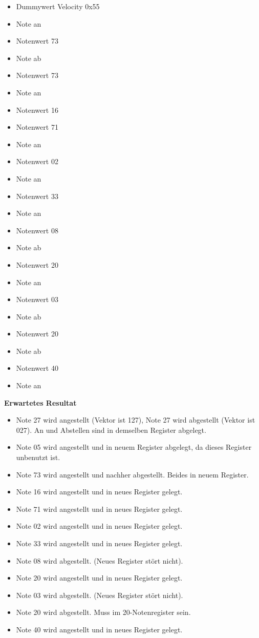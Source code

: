 \begin{itemize}
\item Dummywert Velocity 0x55
\item Note an
\item Notenwert 73
\item Note ab
\item Notenwert 73
\item Note an
\item Notenwert 16
\end{itemize}

\begin{itemize}
\item Notenwert 71
\item Note an
\item Notenwert 02
\item Note an
\item Notenwert 33
\item Note an
\item Notenwert 08
\item Note ab
\end{itemize}

\begin{itemize}
\item Notenwert 20
\item Note an
\item Notenwert 03
\item Note ab
\item Notenwert 20
\item Note ab
\item Notenwert 40
\item Note an
\end{itemize}

\textbf{Erwartetes Resultat}

\begin{itemize}
\item Note 27 wird angestellt (Vektor ist 127), Note 27 wird abgestellt (Vektor ist 027). An und Abstellen sind in demselben Register abgelegt.
\item Note 05 wird angestellt und in neuem Register abgelegt, da dieses Register unbenutzt ist.
\item Note 73 wird angestellt und nachher abgestellt. Beides in neuem Register.
\item Note 16 wird angestellt und in neues Register gelegt.
\item Note 71 wird angestellt und in neues Register gelegt.
\item Note 02 wird angestellt und in neues Register gelegt.
\item Note 33 wird angestellt und in neues Register gelegt.
\item Note 08 wird abgestellt. (Neues Register stört nicht).
\item Note 20 wird angestellt und in neues Register gelegt.
\item Note 03 wird abgestellt. (Neues Register stört nicht).
\item Note 20 wird abgestellt. Muss im 20-Notenregister sein.
\item Note 40 wird angestellt und in neues Register gelegt.
\end{itemize}

